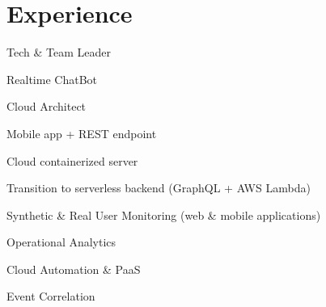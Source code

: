 \documentclass[letterpaper]{deedy-resume} %
\begin{document}
\hfill
%
%
\begin{minipage}[t]{0.66\textwidth} %


\section{Experience}


\vspace{\topsep} %
\begin{tightitemize}
\item Tech \& Team Leader
\item Realtime ChatBot
\item Cloud Architect
\end{tightitemize}

\sectionspace %


\begin{tightitemize}
\item Mobile app + REST endpoint
\item Cloud containerized server
\item Transition to serverless backend (GraphQL + AWS Lambda)
\end{tightitemize}

\sectionspace %


\begin{tightitemize}
\item Synthetic \& Real User Monitoring (web \& mobile applications)
\item Operational Analytics
\item Cloud Automation \& PaaS
\item Event Correlation
\end{tightitemize}


\end{minipage}
\end{document}
